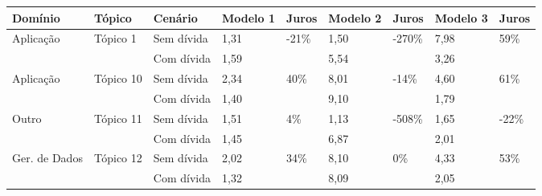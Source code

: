 \small
\begin{longtable}{|l|l|l|l|l|l|l|l|l|}
\hline
\textbf{Domínio}               & \textbf{Tópico}            & \textbf{Cenário} & \textbf{Modelo 1} & \textbf{Juros}          &  \textbf{Modelo 2} & \textbf{Juros}           &  \textbf{Modelo 3} & \textbf{Juros}                   \\ \endhead \hline
\multirow{2}{*}{Aplicação}     & \multirow{2}{*}{Tópico 1}  & Sem dívida              & 1,31            & \multirow{2}{*}{-21\%}  & 1,50            & \multirow{2}{*}{-270\%}  & 7,98            & \multirow{2}{*}{59\%}   \\ \cline{3-4} \cline{6-6} \cline{8-8}
                               &                            & Com dívida           & 1,59            &                         & 5,54            &                          & 3,26            &                         \\ \hline
\multirow{2}{*}{Aplicação}     & \multirow{2}{*}{Tópico 10} & Sem dívida              & 2,34            & \multirow{2}{*}{40\%}   & 8,01            & \multirow{2}{*}{-14\%}   & 4,60            & \multirow{2}{*}{61\%}   \\ \cline{3-4} \cline{6-6} \cline{8-8}
                               &                            & Com dívida           & 1,40            &                         & 9,10            &                          & 1,79            &                         \\ \hline
\multirow{2}{*}{Outro}         & \multirow{2}{*}{Tópico 11} & Sem dívida              & 1,51            & \multirow{2}{*}{4\%}    & 1,13            & \multirow{2}{*}{-508\%}  & 1,65            & \multirow{2}{*}{-22\%}  \\ \cline{3-4} \cline{6-6} \cline{8-8}
                               &                            & Com dívida           & 1,45            &                         & 6,87            &                          & 2,01            &                         \\ \hline
\multirow{2}{*}{Ger. de Dados} & \multirow{2}{*}{Tópico 12} & Sem dívida              & 2,02            & \multirow{2}{*}{34\%}   & 8,10            & \multirow{2}{*}{0\%}     & 4,33            & \multirow{2}{*}{53\%}   \\ \cline{3-4} \cline{6-6} \cline{8-8}
                               &                            & Com dívida           & 1,32            &                         & 8,09            &                          & 2,05            &                         \\ \hline

\end{longtable}
